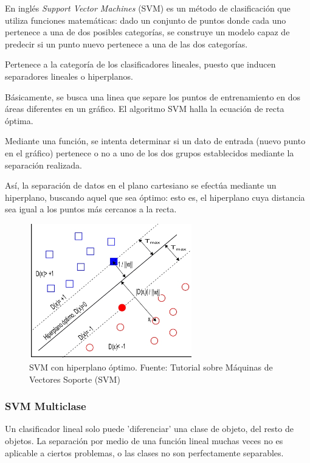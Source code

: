 \documentclass[a4paper,12pt,oneside,spanish]{book}
\begin{document}
En inglés \textit{Support Vector Machines} (SVM) es un método de clasificación que utiliza funciones matemáticas: dado un conjunto de puntos donde cada uno pertenece a una de dos posibles categorías, se construye un modelo capaz de predecir si un punto nuevo pertenece a una de las dos categorías.  \par

Pertenece a la categoría de los clasificadores lineales, puesto que inducen separadores lineales o hiperplanos. \par

Básicamente, se busca una linea que separe los puntos de entrenamiento en dos áreas diferentes en un gráfico. El algoritmo SVM halla la ecuación de recta óptima.\par

Mediante una función, se intenta determinar si un dato de entrada (nuevo punto en el gráfico) pertenece o no a uno de los dos grupos establecidos mediante la separación realizada. \par

Así, la separación de datos en el plano cartesiano se efectúa mediante un hiperplano, buscando aquel que sea óptimo: esto es, el hiperplano cuya distancia sea igual a los puntos más cercanos a la recta.\par

\begin{figure}[h!]
	\includegraphics[width=200pt]{Imagenes/svm1.jpg}
	\centering
	\caption{SVM con hiperplano óptimo. Fuente: Tutorial sobre Máquinas de Vectores Soporte (SVM) \cite{svm1}}
	\label{fig:svm1}
\end{figure}

\subsubsection{SVM Multiclase}
Un clasificador lineal solo puede 'diferenciar' una clase de objeto, del resto de objetos. La separación por medio de una función lineal muchas veces no es aplicable a ciertos problemas, o las clases no son perfectamente separables. \par
\end{document}
